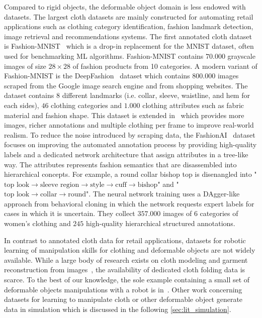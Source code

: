 \documentclass[\home/main.tex]{subfiles}
\begin{document}
Compared to rigid objects, the deformable object domain is less endowed with datasets. The largest cloth datasets are mainly constructed for automating retail applications such as clothing category identification, fashion landmark detection, image retrieval and recommendations systems. The first annotated cloth dataset is Fashion-MNIST~\autocite{fashionmnist} which is a drop-in replacement for the MNIST dataset, often used for benchmarking ML algorithms. Fashion-MNIST contains $70.000$ grayscale images of size $28\times28$ of fashion products from 10 categories. A modern variant of Fashion-MNIST is the DeepFashion~\autocite{DeepFashion} dataset which contains $800.000$ images scraped from the Google image search engine and from shopping websites. The dataset contains $8$ different landmarks (i.e. collar, sleeve, waistline, and hem for each sides), $46$ clothing categories and $1.000$ clothing attributes such as fabric material and fashion shape. This dataset is extended in~\autocite{DeepFashion2} which provides more images, richer annotations and multiple clothing per frame to improve real-world realism. To reduce the noise introduced by scraping data, the FashionAI~\autocite{FashionAI} dataset focuses on improving the automated annotation process by providing high-quality labels and a dedicated network architecture that assign attributes in a tree-like way. The attributes represents fashion semantics that are disassembled into hierarchical concepts. For example, a round collar bishop top is disenangled into "$\text{top look} \rightarrow \text{sleeve region} \rightarrow \text{style} \rightarrow \text{cuff} \rightarrow \text{bishop}$" and  "$\text{top look} \rightarrow \text{collar} \rightarrow \text{round}$". The neural network training uses a DAgger-like approach from behavioral cloning in which the network requests expert labels for cases in which it is uncertain. They collect $357.000$ images of $6$ categories of women's clothing and $245$ high-quality hierarchical structured annotations.

In contrast to annotated cloth data for retail applications, datasets for robotic learning of manipulation skills for clothing and deformable objects are not widely available. While a large body of research exists on cloth modeling and garment reconstruction from images~\autocite{bertiche2020cloth3d,deepfashion3d,Wang20183dgarment}, the availability of dedicated cloth folding data is scarce. To the best of our knowledge, the sole example containing a small set of deformable objects manipulations with a robot is in~\autocite{mandlekar2018roboturk}. Other work concerning datasets for learning to manipulate cloth or other deformable object generate data in simulation which is discussed in the following \cref{sec:lit_simulation}.
 
\end{document}

